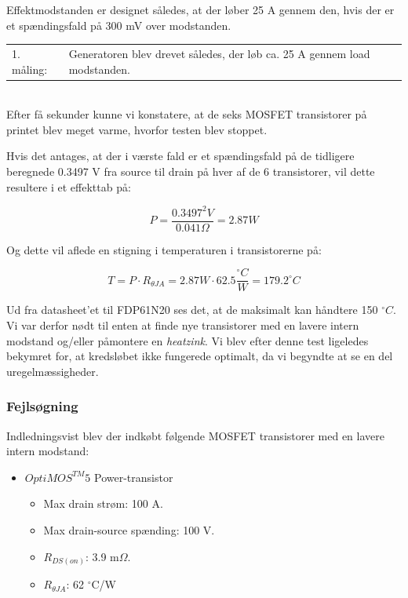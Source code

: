 Effektmodstanden er designet således, at der løber 25 A gennem den, hvis der er et spændingsfald på 300 mV over modstanden.\\

\begin{tabular}{p{2cm}l}
  1. måling: &Generatoren blev drevet således, der løb ca. 25 A gennem load modstanden.\\
\end{tabular}\\

Efter få sekunder kunne vi konstatere, at de seks MOSFET transistorer på printet blev meget varme, hvorfor testen blev stoppet.

Hvis det antages, at der i værste fald er et spændingsfald på de tidligere beregnede 0.3497 V fra source til drain på hver af de 6 transistorer, vil dette resultere i et effekttab på:

\begin{equation}
  \label{eq:2}
  P = \frac{0.3497^2V}{0.041 \Omega}=2.87 W
\end{equation}

Og dette vil aflede en stigning i temperaturen i transistorerne på:

\begin{equation}
  \label{eq:3}
  T=P\cdot R_{\theta JA} = 2.87 W \cdot 62.5 \frac{^\circ C}{W}=179.2 ^\circ C
\end{equation}

Ud fra datasheet’et til FDP61N20 ses det, at de maksimalt kan håndtere 150 $^\circ C$. Vi var derfor nødt til enten at finde nye transistorer med en lavere intern modstand og/eller påmontere en \textit{heatzink}. Vi blev efter denne test ligeledes bekymret for, at kredsløbet ikke fungerede optimalt, da vi begyndte at se en del uregelmæssigheder.

\subsubsection{Fejlsøgning}
\label{sec:fejlsogning}

Indledningsvist blev der indkøbt følgende MOSFET transistorer med en lavere intern modstand:

\begin{itemize}
\item $OptiMOS^{TM}5$ Power-transistor
  \begin{itemize}
  \item Max drain strøm: 100 A.
  \item Max drain-source spænding: 100 V.
  \item $R_{DS(on)}$: 3.9 m$\Omega$.
  \item $R_{\theta JA}$: 62 $^\circ$C/W
  \end{itemize}
\end{itemize}

